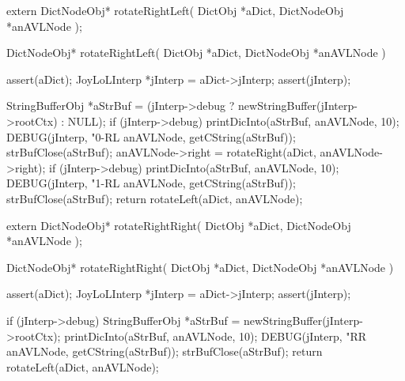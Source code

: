 \startCHeader
extern DictNodeObj* rotateRightLeft(
  DictObj     *aDict,
  DictNodeObj *anAVLNode
);
\stopCHeader

\startCCode
DictNodeObj* rotateRightLeft(
  DictObj     *aDict,
  DictNodeObj *anAVLNode
) {
  assert(aDict);
  JoyLoLInterp *jInterp = aDict->jInterp;
  assert(jInterp);
  
  StringBufferObj *aStrBuf =
    (jInterp->debug ? newStringBuffer(jInterp->rootCtx) : NULL);
  if (jInterp->debug) {
    printDicInto(aStrBuf, anAVLNode, 10);
    DEBUG(jInterp, "0-RL %
      anAVLNode, getCString(aStrBuf));
    strBufClose(aStrBuf);
  }
  anAVLNode->right = rotateRight(aDict, anAVLNode->right);
  if (jInterp->debug) {
    printDicInto(aStrBuf, anAVLNode, 10);
    DEBUG(jInterp, "1-RL %
      anAVLNode, getCString(aStrBuf));
    strBufClose(aStrBuf);
  }
  return rotateLeft(aDict, anAVLNode);
}
\stopCCode

\startCHeader
extern DictNodeObj* rotateRightRight(
  DictObj     *aDict,
  DictNodeObj *anAVLNode
);
\stopCHeader

\startCCode
DictNodeObj* rotateRightRight(
  DictObj     *aDict,
  DictNodeObj *anAVLNode
) {
  assert(aDict);
  JoyLoLInterp *jInterp = aDict->jInterp;
  assert(jInterp);
  
  if (jInterp->debug) {
    StringBufferObj *aStrBuf = newStringBuffer(jInterp->rootCtx);
    printDicInto(aStrBuf, anAVLNode, 10);
    DEBUG(jInterp, "RR %
      anAVLNode, getCString(aStrBuf));
    strBufClose(aStrBuf);
  }
  return rotateLeft(aDict, anAVLNode);
}
\stopCCode

